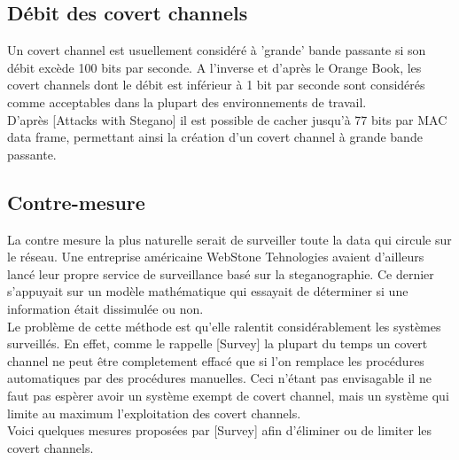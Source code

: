 \documentclass{acm_proc_article-sp}
\begin{document}

\subsection{Débit des covert channels}
Un covert channel est usuellement considéré à 'grande' bande passante si son débit excède 100 bits par seconde. A l'inverse et d'après le Orange Book, les covert channels dont le débit est inférieur à 1 bit par seconde sont considérés comme acceptables dans la plupart des environnements de travail.\\
D'après [Attacks with Stegano] il est possible de cacher jusqu'à 77 bits par MAC data frame, permettant ainsi la création d'un covert channel à grande bande passante.

\subsection{Contre-mesure}
La contre mesure la plus naturelle serait de surveiller toute la data qui circule sur le réseau. Une entreprise américaine WebStone Tehnologies avaient d'ailleurs lancé leur propre service de surveillance basé sur la steganographie. Ce dernier s'appuyait sur un modèle mathématique qui essayait de déterminer si une information était dissimulée ou non.\\
Le problème de cette méthode est qu'elle ralentit considérablement les systèmes surveillés. En effet, comme le rappelle [Survey] la plupart du temps un covert channel ne peut être completement effacé que si l'on remplace les procédures automatiques par des procédures manuelles. Ceci n'étant pas envisagable il ne faut pas espèrer avoir un système exempt de covert channel, mais un système qui limite au maximum l'exploitation des covert channels.\\
Voici quelques mesures proposées par [Survey] afin d'éliminer ou de limiter les covert channels.
\end{document}
